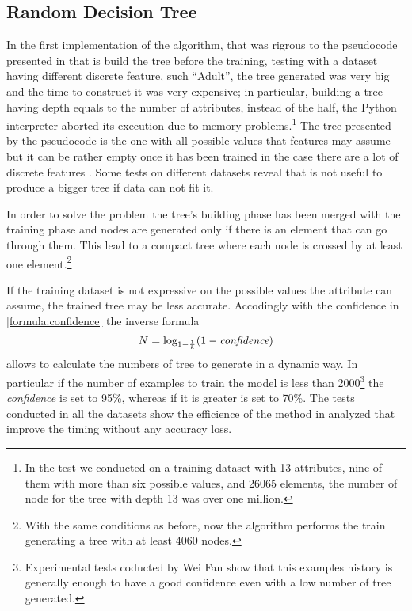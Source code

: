 \documentclass{acm_proc_article-sp-sigmod07}
\begin{document}
\subsection{Random Decision Tree}
In the first implementation of the algorithm, that was rigrous to the
pseudocode presented in \cite{fan:rdt} that is build the tree before the
training, testing with a dataset having different discrete feature, such
``Adult'', the tree generated was very big and the time to construct it was
very expensive; in particular, building a tree having depth equals to the
number of attributes, instead of the half, the Python interpreter
aborted its execution due to memory problems.\footnote{In the test we
conducted on a training dataset with 13 attributes, nine of them with
more than six possible values, and 26065 elements, the number of node for
the tree with depth 13 was over one million.}
The tree presented by the pseudocode is the one with all possible values
that features may assume but it can be rather empty once it has been
trained in the case there are a lot of discrete features . Some tests
on different datasets reveal that is not useful to produce a bigger tree if
data can not fit it.

In order to solve the problem the tree's building phase has been merged
with the training phase and nodes are generated only if there is an element
that can go through them. This lead to a compact tree where
each node is crossed by at least one element.\footnote{With the same
conditions as before, now the algorithm performs the train generating a
tree with at least 4060 nodes.}

If the training dataset is not expressive on the possible values
the attribute can assume, the trained tree may be less accurate.
Accodingly with the confidence in \ref{formula:confidence} the inverse
formula
\begin{equation}
\label{formula:N_generate}
N = \log_{1-\frac{1}{k}}({1 - \emph{confidence}})
\end{equation}
allows to calculate the numbers of tree to generate in a dynamic way. In
 particular if the number of examples to train the model is less than
2000\footnote{Experimental tests coducted by Wei Fan show that this
examples history is generally enough to have a good confidence even with a
low number of tree generated.} the \emph{confidence} is set to 95\%,
whereas if it is greater is set to 70\%. The tests conducted in all the
datasets show the efficience of the method in analyzed that improve the
timing without any accuracy loss.
\end{document}
